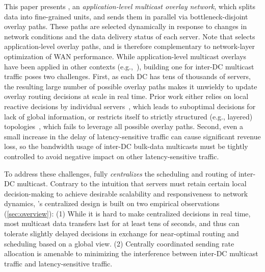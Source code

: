 This paper presents {\em \name}, an {\em application-level multicast
overlay network}, which splits data into fine-grained units, and
sends them in parallel via bottleneck-disjoint overlay paths. These
paths are selected dynamically in response to changes in network
conditions and the data delivery status of each server. Note that
\name selects application-level overlay paths, and is therefore
complementary to network-layer optimization of WAN performance.
While application-level multicast overlays have been applied in other
contexts (e.g.,~\cite{Liebeherr2002Application,Wang2007mTreebone,
Andreev2013Designing,Mokhtarian2015Minimum}), building one for
inter-DC multicast traffic poses two challenges. First, as each DC
has tens of thousands of servers, the resulting large number of
possible overlay paths makes it unwieldy to update overlay routing
decisions at scale in real time. Prior work either relies on local
reactive decisions by individual servers~\cite{kostic2003bullet,
Repantis2010Scaling,Huang2014A}, which leads to suboptimal decisions
for lack of global information, or restricts itself to strictly
structured (e.g., layered) topologies~\cite{Nygren2010The}, which
fails to leverage all possible overlay paths. Second, even a small
increase in the delay of latency-sensitive traffic can cause
significant revenue loss, so the bandwidth usage of inter-DC
bulk-data multicasts must be tightly controlled to avoid negative
impact on other latency-sensitive traffic.

To address these challenges, \name fully {\em centralizes} the
scheduling and routing of inter-DC multicast. Contrary to the
intuition that servers must retain certain local decision-making to
achieve desirable scalability and responsiveness to network dynamics,
\name's centralized design is built on two empirical observations
(\Section\ref{sec:overview}):
(1) While it is hard to make centralized decisions in real time, most
multicast data transfers last for at least tens of seconds, and thus
can tolerate slightly delayed decisions in exchange for near-optimal
routing and scheduling based on a global view.
(2) Centrally coordinated sending rate allocation is amenable to
minimizing the interference between inter-DC multicast traffic and
latency-sensitive traffic.

